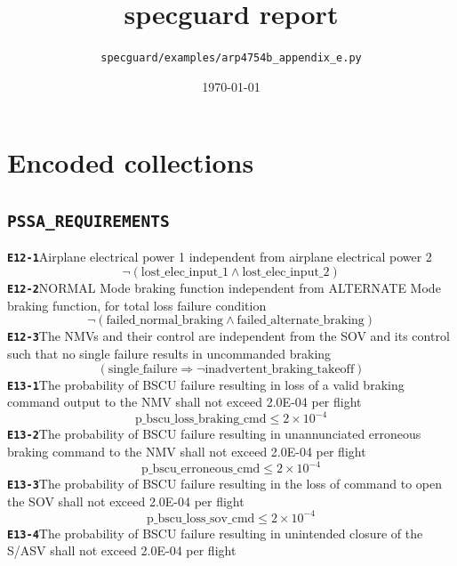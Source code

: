 \documentclass[11pt,a4paper]{article}
\title{\textsf{\textbf{\Huge specguard report}}}
\author{\texttt{specguard/examples/arp4754b\_appendix\_e.py}}
\date{\today}
\begin{document}
\maketitle
\section{Encoded collections}
\subsection*{\texttt{PSSA\_REQUIREMENTS}}
\noindent\textbf{\texttt{E12-1}}\quad Airplane electrical power 1 independent from airplane electrical power 2
\begin{dmath*}
\neg (\text{lost\_elec\_input\_1} \wedge \text{lost\_elec\_input\_2})
\end{dmath*}
\noindent\textbf{\texttt{E12-2}}\quad NORMAL Mode braking function independent from ALTERNATE Mode braking function, for total loss failure condition
\begin{dmath*}
\neg (\text{failed\_normal\_braking} \wedge \text{failed\_alternate\_braking})
\end{dmath*}
\noindent\textbf{\texttt{E12-3}}\quad The NMVs and their control are independent from the SOV and its control such that no single failure results in uncommanded braking
\begin{dmath*}
(\text{single\_failure} \Rightarrow \neg \text{inadvertent\_braking\_takeoff})
\end{dmath*}
\noindent\textbf{\texttt{E13-1}}\quad The probability of BSCU failure resulting in loss of a valid braking command output to the NMV shall not exceed 2.0E-04 per flight
\begin{dmath*}
\text{p\_bscu\_loss\_braking\_cmd} \leq 2 \times 10^{-4}
\end{dmath*}
\noindent\textbf{\texttt{E13-2}}\quad The probability of BSCU failure resulting in unannunciated erroneous braking command to the NMV shall not exceed 2.0E-04 per flight
\begin{dmath*}
\text{p\_bscu\_erroneous\_cmd} \leq 2 \times 10^{-4}
\end{dmath*}
\noindent\textbf{\texttt{E13-3}}\quad The probability of BSCU failure resulting in the loss of command to open the SOV shall not exceed 2.0E-04 per flight
\begin{dmath*}
\text{p\_bscu\_loss\_sov\_cmd} \leq 2 \times 10^{-4}
\end{dmath*}
\noindent\textbf{\texttt{E13-4}}\quad The probability of BSCU failure resulting in unintended closure of the S/ASV shall not exceed 2.0E-04 per flight
\end{document}

